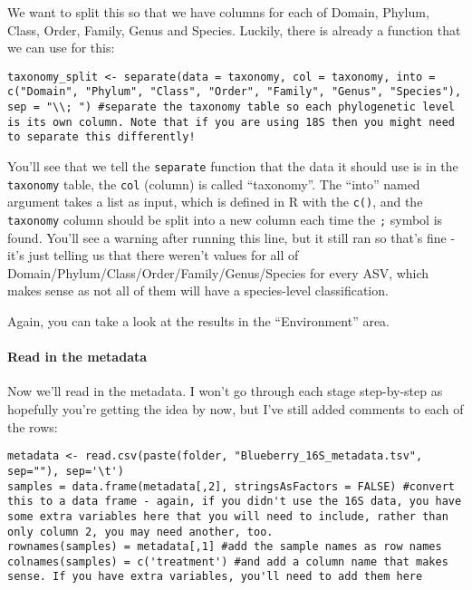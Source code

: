 \documentclass[
]{book}
\begin{document}
We want to split this so that we have columns for each of Domain, Phylum, Class, Order, Family, Genus and Species. Luckily, there is already a function that we can use for this:

\begin{verbatim}
taxonomy_split <- separate(data = taxonomy, col = taxonomy, into = c("Domain", "Phylum", "Class", "Order", "Family", "Genus", "Species"), sep = "\\; ") #separate the taxonomy table so each phylogenetic level is its own column. Note that if you are using 18S then you might need to separate this differently!
\end{verbatim}

You'll see that we tell the \texttt{separate} function that the data it should use is in the \texttt{taxonomy} table, the \texttt{col} (column) is called ``taxonomy''. The ``into'' named argument takes a list as input, which is defined in R with the \texttt{c()}, and the \texttt{taxonomy} column should be split into a new column each time the \texttt{;} symbol is found. You'll see a warning after running this line, but it still ran so that's fine - it's just telling us that there weren't values for all of Domain/Phylum/Class/Order/Family/Genus/Species for every ASV, which makes sense as not all of them will have a species-level classification.

Again, you can take a look at the results in the ``Environment'' area.

\paragraph{Read in the metadata}\label{read-in-the-metadata-1}

Now we'll read in the metadata. I won't go through each stage step-by-step as hopefully you're getting the idea by now, but I've still added comments to each of the rows:

\begin{verbatim}
metadata <- read.csv(paste(folder, "Blueberry_16S_metadata.tsv", sep=""), sep='\t')
samples = data.frame(metadata[,2], stringsAsFactors = FALSE) #convert this to a data frame - again, if you didn't use the 16S data, you have some extra variables here that you will need to include, rather than only column 2, you may need another, too. 
rownames(samples) = metadata[,1] #add the sample names as row names
colnames(samples) = c('treatment') #and add a column name that makes sense. If you have extra variables, you'll need to add them here
\end{verbatim}
\end{document}
